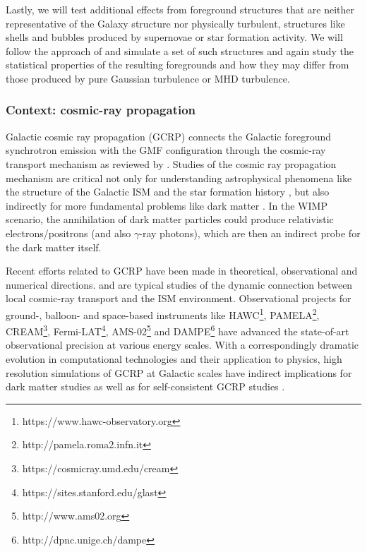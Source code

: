 \documentclass[12pt]{article}
\begin{document}
Lastly, we will test additional effects from foreground structures that are neither representative of the Galaxy structure nor physically turbulent, structures like shells and bubbles produced by supernovae or star formation activity.  We will follow the approach of \cite{Mertsch:2013gg} and simulate a set of such structures and again study the statistical properties of the resulting foregrounds and how they may differ from those produced by pure Gaussian turbulence or MHD turbulence.  


\subsubsection*{Context: cosmic-ray propagation}

Galactic cosmic ray propagation (GCRP) connects the Galactic foreground synchrotron emission with the GMF configuration through the cosmic-ray  transport mechanism as reviewed by \cite{Strong2007}. 
Studies of the cosmic ray propagation mechanism are critical not only for understanding astrophysical phenomena like the structure of the Galactic ISM  \citep{Li2013,Pfrommer2017} and the star formation history \citep{Li2017},  but also indirectly for more fundamental problems like dark matter \citep{Colafrancesco2006a,Gaggero2018}.
In the WIMP scenario, the annihilation of dark matter particles could produce relativistic electrons/positrons (and also $\gamma$-ray photons), which are then an indirect probe for the dark matter itself.

Recent efforts related to GCRP have been made in theoretical, observational and numerical directions.
\cite{Seta2018} and \cite{Shukurov2017} are typical studies of the dynamic connection between local cosmic-ray transport and the ISM environment.
Observational projects for ground-, balloon- and space-based instruments like HAWC\footnote{https://www.hawc-observatory.org}, PAMELA\footnote{http://pamela.roma2.infn.it}, CREAM\footnote{https://cosmicray.umd.edu/cream}, Fermi-LAT\footnote{https://sites.stanford.edu/glast}, AMS-02\footnote{http://www.ams02.org} and DAMPE\footnote{http://dpnc.unige.ch/dampe} have advanced the state-of-art observational precision at various energy scales.
With a correspondingly dramatic evolution in computational technologies and their application to physics, high resolution simulations of GCRP \citep{Orlando2017,Evoli2016,Kissmann2014} at Galactic scales have indirect implications for dark matter studies \citep{Cui2017,Cuoco2017} as well as for  self-consistent GCRP studies \citep{Blasi2012,Evoli2018}.
\end{document}
